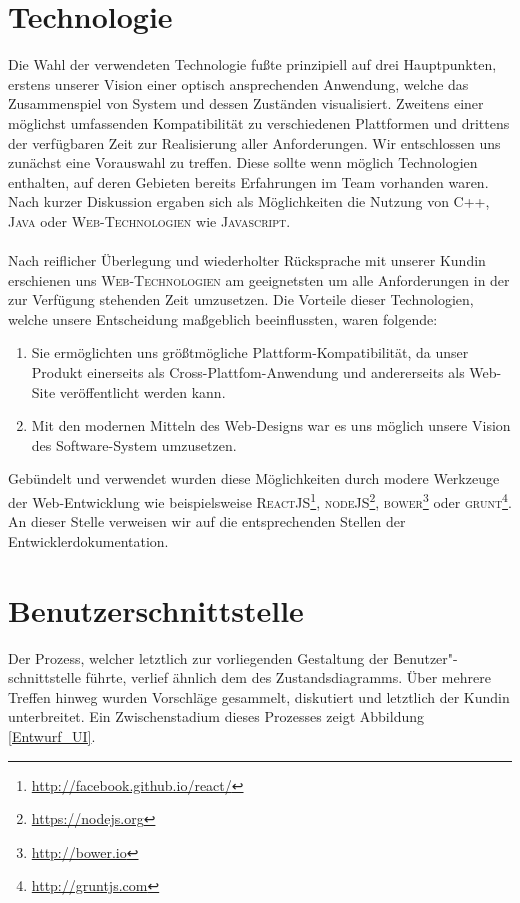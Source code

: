 \section{Technologie}
Die Wahl der verwendeten Technologie fußte prinzipiell auf drei Hauptpunkten, erstens unserer Vision einer optisch ansprechenden Anwendung, welche das Zusammenspiel von System und dessen Zuständen visualisiert. Zweitens einer möglichst umfassenden Kompatibilität zu verschiedenen Plattformen und drittens der verfügbaren Zeit zur Realisierung aller Anforderungen. Wir entschlossen uns zunächst eine Vorauswahl zu treffen. Diese sollte wenn möglich Technologien enthalten, auf deren Gebieten bereits Erfahrungen im Team vorhanden waren. Nach kurzer Diskussion ergaben sich als Möglichkeiten die Nutzung von \textsc{C++}, \textsc{Java} oder \textsc{Web-Technologien} wie \textsc{Javascript}.

\paragraph*{}Nach reiflicher Überlegung und wiederholter Rücksprache mit unserer Kundin erschienen uns \textsc{Web-Technologien} am geeignetsten um alle Anforderungen in der zur Verfügung stehenden Zeit umzusetzen. Die Vorteile dieser Technologien, welche unsere Entscheidung maßgeblich beeinflussten, waren folgende:

\begin{enumerate}
	\item Sie ermöglichten uns größtmögliche Plattform-Kompa\-tibilität, da unser Produkt einerseits als Cross-Plattfom-Anwendung und andererseits als Web-Site veröffentlicht werden kann.
	\item Mit den modernen Mitteln des Web-Designs war es uns möglich unsere Vision des Software-System umzusetzen.
\end{enumerate}

Gebündelt und verwendet wurden diese Möglichkeiten durch modere Werkzeuge der Web-Entwicklung wie beispielsweise \textsc{ReactJS}\footnote{\url{http://facebook.github.io/react/}}, \textsc{nodeJS}\footnote{\url{https://nodejs.org}}, \textsc{bower}\footnote{\url{http://bower.io}} oder \textsc{grunt}\footnote{\url{http://gruntjs.com}}. An dieser Stelle verweisen wir auf die entsprechenden Stellen der Entwicklerdokumentation.

\section{Benutzerschnittstelle}
Der Prozess, welcher letztlich zur vorliegenden Gestaltung der Benutzer"-schnittstelle führte, verlief ähnlich dem des Zustandsdiagramms. Über mehrere Treffen hinweg wurden Vorschläge gesammelt, diskutiert und letztlich der Kundin unterbreitet. Ein Zwischenstadium dieses Prozesses zeigt Abbildung \ref{Entwurf_UI}.

